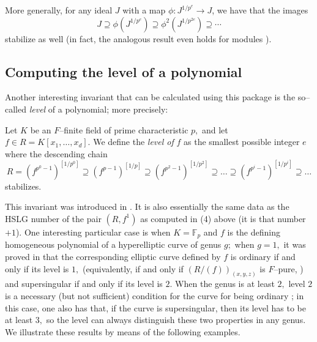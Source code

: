 \documentclass{amsart}
\begin{document}
\medskip
{\small
{}
}\medskip




More generally, for any ideal $J$ with a map $\phi : J^{1/p^e} \to J$, we have that the images
\[
J \supseteq \phi(J^{1/p^e}) \supseteq \phi^2(J^{1/p^{2e}}) \supseteq \cdots
\]
stabilize as well (in fact, the analogous result even holds for modules \cite{Gabber.tStruc}).


\subsection{Computing the level of a polynomial}
Another interesting invariant that can be calculated using this package
is the so--called \emph{level} of a polynomial; more precisely:

\begin{definition}
Let $K$ be an $F$--finite field of prime characteristic $p,$ and let
$f\in R=K[x_1,\ldots, x_d].$ We define the \emph{level of} $f$ as the
smallest possible integer $e$ where the descending chain
\[
R=(f^{p^0-1})^{[1/p^0]}\supseteq (f^{p-1})^{[1/p]}\supseteq
(f^{p^2-1})^{[1/p^2]}\supseteq\ldots%
\supseteq (f^{p^i-1})^{[1/p^i]}\supseteq\ldots
\]
stabilizes.
\end{definition}
This invariant was introduced in \cite{AlvarezBlickleLyubeznik2005}.  It is also essentially the same data as the HSLG number of the pair $(R, f^1)$ as computed in (4) above (it is that number $+1$).
One interesting particular
case is when $K=\mathbb{F}_p$ and $f$ is the defining homogeneous polynomial of a hyperelliptic curve
of genus $g;$ when $g=1,$ it was proved in
\cite{BoixDeStefaniVanzo2015} that the corresponding elliptic curve defined by $f$
is ordinary if and only if its level is $1,$ (equivalently, if and only if
$(R/(f))_{(x,y,z)}$ is $F$--pure, %
) and supersingular if and only if its level is $2.$ When
the genus is at least $2,$ level $2$ is a necessary (but not sufficient) condition for the curve
for being ordinary \cite{BlancoBoixFordhamYilmaz2018}; in this case, one also
has that, if the curve is supersingular, then its level has to be at least $3,$ so the level can
always distinguish these two properties in any genus. We illustrate these results by means
of the following examples.
\end{document}
